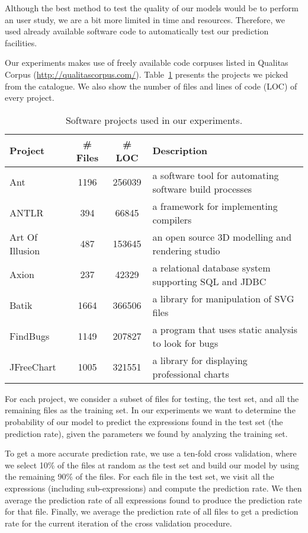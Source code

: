 \documentclass{article} %
\begin{document}
Although the best method to test the quality of our models would be to perform an user study, we are a bit more limited in time and resources. Therefore, we used already available software code to automatically test our prediction facilities.

Our experiments makes use of freely available code corpuses listed in Qualitas Corpus (\url{http://qualitascorpus.com/}).
Table~\ref{tab:projects} presents the projects we picked from the catalogue. We also show the number of files and
lines of code (LOC) of every project.

\begin{table}[ht]
\centering
\begin{tabular}{|l|c|c|l|}
\hline
\textbf{Project} & \textbf{\# Files} & \textbf{\# LOC} & \textbf{Description} \\
\hline
Ant & 1196 & 256039 & a software tool for automating software build processes \\
ANTLR & 394 & 66845 & a framework for implementing compilers \\
Art Of Illusion & 487 & 153645 & an open source 3D modelling and rendering studio \\
Axion & 237 & 42329 & a relational database system supporting SQL and JDBC \\
Batik & 1664 & 366506 & a library for manipulation of SVG files \\
FindBugs & 1149 & 207827 & a program that uses static analysis to look for bugs \\
JFreeChart & 1005 & 321551 & a library for displaying professional charts \\
\hline
\end{tabular}
\caption{Software projects used in our experiments.}
\label{tab:projects}
\end{table}

For each project, we consider a subset of files for testing, the test set, and all the remaining files as the training set.
In our experiments we want to determine the probability of our model to predict the expressions found in the test set (the prediction rate), given the parameters we found by analyzing the training set.

To get a more accurate prediction rate, we use a ten-fold cross validation, where we select 10\% of the files at random as the test set and build our model by using the remaining 90\% of the files. For each file in the test set, we visit all the expressions (including sub-expressions) and compute the prediction rate. We then average the prediction rate of all expressions found to produce the prediction rate for that file. Finally, we average the prediction rate of all files to get a prediction rate for the current iteration of the cross validation procedure.
\end{document}
